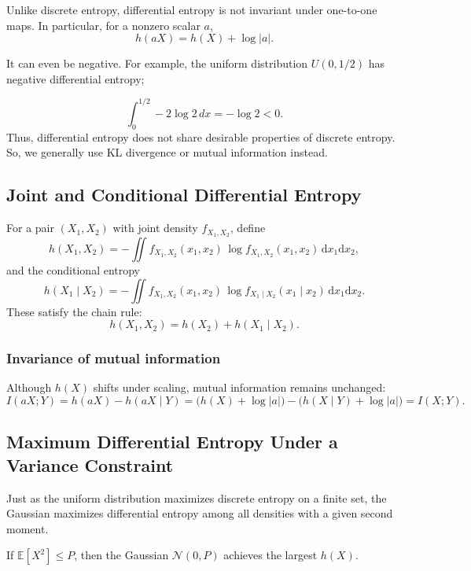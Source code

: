 Unlike discrete entropy, differential entropy is not invariant under one-to-one maps.  In particular, for a nonzero scalar $a$,
\[
h(aX)=h(X)+\log|a|.
\]

It can even be negative. For example, the uniform distribution $U(0,1/2)$ has negative differential entropy;

$$\int_{0}^{1/2}-2\log2\,dx=-\log2<0.$$
Thus, differential entropy does not share desirable properties of discrete entropy. So, we generally use KL divergence or mutual information instead.

\subsection{Joint and Conditional Differential Entropy}

For a pair $(X_1,X_2)$ with joint density $f_{X_1,X_2}$, define
\[
h(X_1,X_2)
=-\iint f_{X_1,X_2}(x_1,x_2)\,\log f_{X_1,X_2}(x_1,x_2)\,\mathrm{d}x_1\mathrm{d}x_2,
\]
and the conditional entropy
\[
h(X_1\mid X_2)
=-\iint f_{X_1,X_2}(x_1,x_2)\,\log f_{X_1\mid X_2}(x_1\mid x_2)\,\mathrm{d}x_1\mathrm{d}x_2.
\]
These satisfy the chain rule:
\[
h(X_1,X_2)=h(X_2)+h(X_1\mid X_2).
\]

\subsubsection*{Invariance of mutual information}
Although $h(X)$ shifts under scaling, mutual information remains unchanged:
    \[
    I(aX;Y)
    = h(aX)-h(aX\mid Y)
    = \bigl(h(X)+\log|a|\bigr)-\bigl(h(X\mid Y)+\log|a|\bigr)
    = I(X;Y).
    \]

\subsection{Maximum Differential Entropy Under a Variance Constraint}

Just as the uniform distribution maximizes discrete entropy on a finite set, the Gaussian maximizes differential entropy among all densities with a given second moment.

\begin{theorem}
  If $\mathbb{E}[X^2]\le P$, then the Gaussian $\mathcal{N}(0,P)$ achieves the largest $h(X)$.
\end{theorem}


